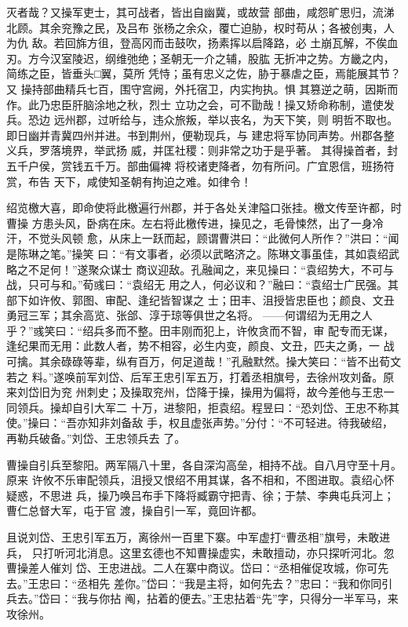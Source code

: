 灭者哉？又操军吏士，其可战者，皆出自幽冀，或故营
部曲，咸怨旷思归，流涕北顾。其余兖豫之民，及吕布
张杨之余众，覆亡迫胁，权时苟从；各被创夷，人为仇
敌。若回旆方徂，登高冈而击鼓吹，扬素挥以启降路，必
土崩瓦解，不俟血刃。方今汉室陵迟，纲维弛绝；圣朝无一介之辅，股肱
无折冲之势。方畿之内，简练之臣，皆垂头□翼，莫所
凭恃；虽有忠义之佐，胁于暴虐之臣，焉能展其节？又
操持部曲精兵七百，围守宫阙，外托宿卫，内实拘执。惧
其篡逆之萌，因斯而作。此乃忠臣肝脑涂地之秋，烈士
立功之会，可不勖哉！操又矫命称制，遣使发兵。恐边
远州郡，过听给与，违众旅叛，举以丧名，为天下笑，则
明哲不取也。即日幽并青冀四州并进。书到荆州，便勒现兵，与
建忠将军协同声势。州郡各整义兵，罗落境界，举武扬
威，并匡社稷：则非常之功于是乎著。
其得操首者，封五千户侯，赏钱五千万。部曲偏裨
将校诸吏降者，勿有所问。广宜恩信，班扬符赏，布告
天下，咸使知圣朝有拘迫之难。如律令！

绍览檄大喜，即命使将此檄遍行州郡，并于各处关津隘口张挂。檄文传至许都，时曹操
方患头风，卧病在床。左右将此檄传进，操见之，毛骨悚然，出了一身冷汗，不觉头风顿
愈，从床上一跃而起，顾谓曹洪曰：“此微何人所作？”洪曰：“闻是陈琳之笔。”操笑
曰：“有文事者，必须以武略济之。陈琳文事虽佳，其如袁绍武略之不足何！”遂聚众谋士
商议迎敌。孔融闻之，来见操曰：“袁绍势大，不可与战，只可与和。”荀彧曰：“袁绍无
用之人，何必议和？”融曰：“袁绍士广民强。其部下如许攸、郭图、审配、逢纪皆智谋之
士；田丰、沮授皆忠臣也；颜良、文丑勇冠三军；其余高览、张郃、淳于琼等俱世之名将。
——何谓绍为无用之人乎？”彧笑曰：“绍兵多而不整。田丰刚而犯上，许攸贪而不智，审
配专而无谋，逢纪果而无用：此数人者，势不相容，必生内变，颜良、文丑，匹夫之勇，一
战可擒。其余碌碌等辈，纵有百万，何足道哉！”孔融默然。操大笑曰：“皆不出荀文若之
料。”遂唤前军刘岱、后军王忠引军五万，打着丞相旗号，去徐州攻刘备。原来刘岱旧为兖
州刺史；及操取兖州，岱降于操，操用为偏将，故今差他与王忠一同领兵。操却自引大军二
十万，进黎阳，拒袁绍。程昱曰：“恐刘岱、王忠不称其使。”操曰：“吾亦知非刘备敌
手，权且虚张声势。”分付：“不可轻进。待我破绍，再勒兵破备。”刘岱、王忠领兵去
了。

曹操自引兵至黎阳。两军隔八十里，各自深沟高垒，相持不战。自八月守至十月。原来
许攸不乐审配领兵，沮授又恨绍不用其谋，各不相和，不图进取。袁绍心怀疑惑，不思进
兵，操乃唤吕布手下降将臧霸守把青、徐；于禁、李典屯兵河上；曹仁总督大军，屯于官
渡，操自引一军，竟回许都。

且说刘岱、王忠引军五万，离徐州一百里下寨。中军虚打“曹丞相”旗号，未敢进兵，
只打听河北消息。这里玄德也不知曹操虚实，未敢擅动，亦只探听河北。忽曹操差人催刘
岱、王忠进战。二人在寨中商议。岱曰：“丞相催促攻城，你可先去。”王忠曰：“丞相先
差你。”岱曰：“我是主将，如何先去？”忠曰：“我和你同引兵去。”岱曰：“我与你拈
阄，拈着的便去。”王忠拈着“先”字，只得分一半军马，来攻徐州。

